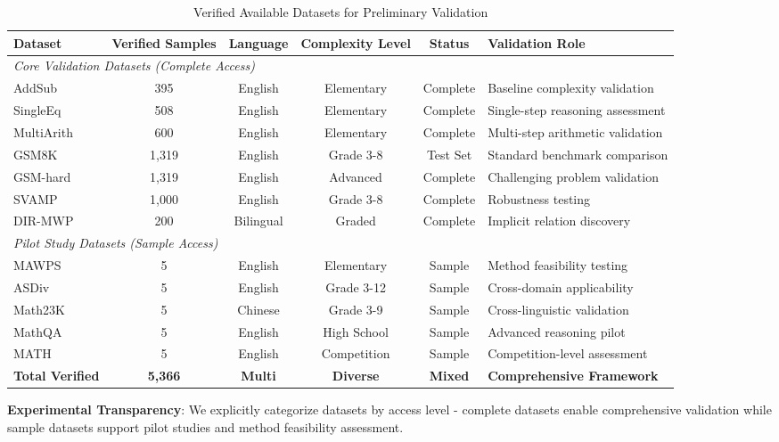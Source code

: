 \begin{table*}[htbp]
\caption{Verified Available Datasets for Preliminary Validation}
\label{tab:verified_datasets}
\centering
\small
\begin{tabular}{lccccl}
\toprule
\textbf{Dataset} & \textbf{Verified Samples} & \textbf{Language} & \textbf{Complexity Level} & \textbf{Status} & \textbf{Validation Role} \\
\midrule
\multicolumn{6}{l}{\textit{Core Validation Datasets (Complete Access)}} \\
AddSub & 395 & English & Elementary & Complete & Baseline complexity validation \\
SingleEq & 508 & English & Elementary & Complete & Single-step reasoning assessment \\
MultiArith & 600 & English & Elementary & Complete & Multi-step arithmetic validation \\
GSM8K & 1,319 & English & Grade 3-8 & Test Set & Standard benchmark comparison \\
GSM-hard & 1,319 & English & Advanced & Complete & Challenging problem validation \\
SVAMP & 1,000 & English & Grade 3-8 & Complete & Robustness testing \\
DIR-MWP & 200 & Bilingual & Graded & Complete & Implicit relation discovery \\
\midrule
\multicolumn{6}{l}{\textit{Pilot Study Datasets (Sample Access)}} \\
MAWPS & 5 & English & Elementary & Sample & Method feasibility testing \\
ASDiv & 5 & English & Grade 3-12 & Sample & Cross-domain applicability \\
Math23K & 5 & Chinese & Grade 3-9 & Sample & Cross-linguistic validation \\
MathQA & 5 & English & High School & Sample & Advanced reasoning pilot \\
MATH & 5 & English & Competition & Sample & Competition-level assessment \\
\midrule
\textbf{Total Verified} & \textbf{5,366} & \textbf{Multi} & \textbf{Diverse} & \textbf{Mixed} & \textbf{Comprehensive Framework} \\
\bottomrule
\end{tabular}
\end{table*}

\textbf{Experimental Transparency}: We explicitly categorize datasets by access level - complete datasets enable comprehensive validation while sample datasets support pilot studies and method feasibility assessment.


